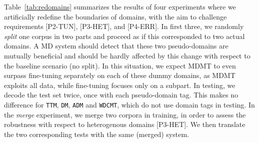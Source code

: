 \documentclass[11pt,a4paper]{article}
\newcommand{\system}[1]{\texttt{{#1}}}
\begin{document}
Table~\ref{tab:redomains} summarizes the results of four experiments where we artificially redefine the boundaries of domains, with the aim to challenge requirements [P2-TUN], [P3-HET], and [P4-ERR]. In first three, we randomly \emph{split} one corpus in two parts and proceed as if this corresponded to two actual domains. A MD system should detect that these two pseudo-domains are mutually beneficial and should be hardly affected by this change with respect to the baseline scenario (no split). In this situation, we expect MDMT to even surpass fine-tuning separately on each of these dummy domains, as MDMT exploits all data, while fine-tuning focuses only on a subpart. In testing, we decode the test set twice, once with each pseudo-domain tag. This makes no difference for \system{TTM}, \system{DM}, \system{ADM} and \system{WDCMT}, which do not use domain tags in testing.
In the \textsl{merge} experiment, we merge two corpora in training, in order to assess the robustness with respect to heterogenous domains [P3-HET]. We then translate the two corresponding tests with the same (merged) system.
\end{document}
